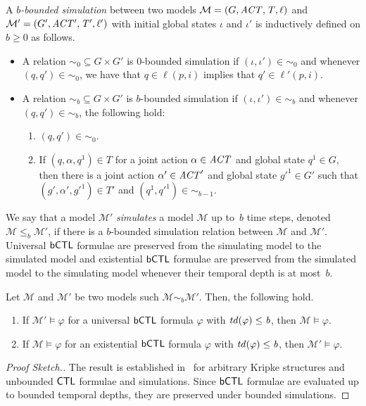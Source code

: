 \begin{definition}
  A \emph{$b$-bounded simulation} between two models
  $\mathcal M = \left ( G, \it{ACT}, T, \ell \right )$ and
  $\mathcal{M'} = \left ( G', \it{ACT'}, T', \ell' \right )$ with initial global states
  $\iota$ and $\iota'$ is inductively defined on $b \geq 0$ as follows.
  \begin{itemize}[$\bullet$]
  \item A relation $\sim_0 \subseteq G \times G'$ is $0$-bounded simulation if
    $(\iota, \iota') \in \sim_0$ and whenever $(q, q') \in \sim_0$, we have
    that $q \in \ell(p,i)$ implies that $q' \in \ell'(p, i)$.
  \item A relation $\sim_b \subseteq G \times G'$ is $b$-bounded simulation if
    $(\iota, \iota') \in \sim_b$ and whenever $(q, q') \in \sim_b$, the
    following hold:
    \begin{enumerate}[1.]
    \item $(q, q') \in \sim_0$.
    \item If $(q, \alpha, q^1) \in T$ for a joint action $\alpha \in \it{ACT}$
      and global state $q^1 \in G$, then there is a joint action
      $\alpha' \in \it{ACT}'$ and global state $g'^1 \in G'$ such that
      $(g', \alpha', g'^1) \in T'$ and $(q^1, q'^1) \in \sim_{b - 1}$.
    \end{enumerate}
  \end{itemize}
\end{definition}

We say that a model $\mathcal{M'}$ \emph{simulates} a model $\mathcal M$ up
to~$b$ time steps, denoted $\mathcal M \leq_b \mathcal{M'}$, if there is a
$b$-bounded simulation relation between $\mathcal M$ and $\mathcal{M'}$.
Universal $\sf{bCTL}$ formulae are preserved from the simulating model to the
simulated model and existential $\sf{bCTL}$ formulae are preserved from the
simulated model to the simulating model whenever their temporal depth is at
most~$b$.

\begin{theorem} Let $\mathcal M$ and $\mathcal M'$ be two models such $\mathcal
M \sim_b  \mathcal M'$. Then, the following hold.
\label{th:sim}
\begin{enumerate}
    \item If $\mathcal M' \models \varphi$ for a universal $\sf{bCTL}$ formula
    $\varphi$ with $\it{td}(\varphi) \leq b$, then $\mathcal M \models
    \varphi$.
    \item If $\mathcal M \models \varphi$ for an existential $\sf{bCTL}$ formula
    $\varphi$ with $\it{td}(\varphi) \leq b$, then $\mathcal M' \models
    \varphi$.
\end{enumerate}
\end{theorem}
\begin{proof}[Proof Sketch.]
The result is established in~\cite{ClarkeGrumbergLong94} for arbitrary Kripke
structures and unbounded $\sf{CTL}$ formulae and simulations. Since $\sf{bCTL}$ formulae
are evaluated up to bounded temporal depths, they are preserved under bounded
simulations.
\end{proof}

